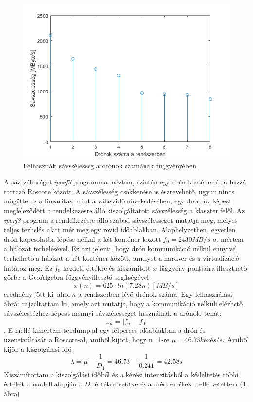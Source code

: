 \begin{figure}
	\centering
	\includegraphics{figures/meres_iperf.png}
	\caption{Felhasznált sávszélesség a drónok számának függvényében}
	\label{fig:meresiperf}
\end{figure}

\noindent
A sávszélességet \emph{iperf3} programmal néztem, szintén egy drón konténer és a hozzá tartozó Roscore között. A sávszélesség csökkenése is észrevehető, ugyan nincs mögötte az a linearitás, mint a válaszidő növekedésében, egy drónhoz képest megfeleződött a rendelkezésre álló kiszolgáltatott sávszélesség a klaszter felől. Az \emph{iperf3} program a rendelkezésre álló szabad sávszélességet mutatja meg, melyet teljes terhelés alatt mér meg egy rövid időablakban. Alaphelyzetben, egyetlen drón kapcsolatba lépése nélkül a két konténer között $f_{0}=2430 MB/s$-ot mértem a hálózat terhelésével. Ez azt jelenti, hogy drón kommunikáció nélkül ennyivel terhelhető a hálózat a két konténer között, amelyet a hardver és a virtualizáció határoz meg. Ez $f_0$ kezdeti értékre és kiszámított $x$ függvény pontjaira illeszthető görbe a GeoAlgebra függvényillesztő segítségével \[ x(n) = 625 \cdot ln(7.28n) [MB/s]\] eredmény jött ki, ahol $n$ a rendszerben lévő drónok száma. Egy felhasználási ábrát rajzoltattam ki, amely azt mutatja, hogy a kommunikáció nélküli elérhető sávszélességhez képest mennyi sávszélességet használnak a drónok, tehát: \[x_n = | f_n - f_0 |\]. E mellé kimértem tcpdump-al egy félperces időablakban a drón és üzenetváltását a Roscore-al, amiből kijött, hogy n=1-re $\mu = 46.73 kérés/s$. Amiből kijön a kiszolgálási idő: \[\lambda= \mu-\frac{1}{D_1} = 46.73-\frac{1}{0.241} = 42.58 s \] Kiszámítottam a kiszolgálási időből és a kérési intenzitásból a késleltetés többi értékét a modell alapján a $D_1$ értékre vetítve és a mért értékek mellé vetettem (\ref{fig:meresiperf}. ábra)  \\

